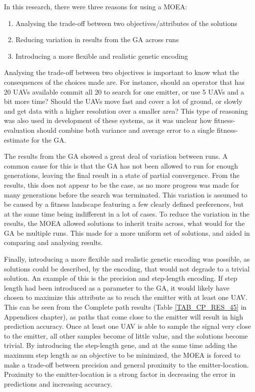 \documentclass[10pt,a4paper]{book}
\begin{document}
In this research, there were three reasons for using a \gls{MOEA}:

\begin{enumerate}
\item Analysing the trade-off between two objectives/attributes of the solutions
\item Reducing variation in results from the \gls{GA} across runs
\item Introducing a more flexible and realistic genetic encoding
\end{enumerate}

Analysing the trade-off between two objectives is important to know what the consequences of the choices made are. For instance, should an operator that has 20 \glspl{UAV} available commit all 20 to search for one emitter, or use 5 \glspl{UAV} and a bit more time? Should the \glspl{UAV} move fast and cover a lot of ground, or slowly and get data with a higher resolution over a smaller area? This type of reasoning was also used in development of these systems, as it was unclear how fitness-evaluation should combine both variance and average error to a single fitness-estimate for the \gls{GA}. 


The results from the \gls{GA} showed a great deal of variation between runs. A common cause for this is that the \gls{GA} has not been allowed to run for enough generations, leaving the final result in a state of partial convergence. From the results, this does not appear to be the case, as no more progress was made for many generations before the search was terminated. This variation is assumed to be caused by a fitness landscape featuring a few clearly defined preferences, but at the same time being indifferent in a lot of cases. To reduce the variation in the results, the \gls{MOEA} allowed solutions to inherit traits across, what would for the \gls{GA} be multiple runs. This made for a more uniform set of solutions, and aided in comparing and analysing results.

Finally, introducing a more flexible and realistic genetic encoding was possible, as solutions could be described, by the encoding, that would not degrade to a trivial solution. An example of this is the precision and step-length encoding. If step length had been introduced as a parameter to the \gls{GA}, it would likely have chosen to maximize this attribute as to reach the emitter with at least one \gls{UAV}. This can be seen from the Complete path results (Table \ref{TAB_CP_RES_45} in Appendices chapter), as paths that come close to the emitter will result in high prediction accuracy.  Once at least one \gls{UAV} is able to sample the signal very close to the emitter, all other samples become of little value, and the solutions become trivial. By introducing the step-length gene, and at the same time adding the maximum step length as an objective to be minimized, the \gls{MOEA} is forced to make a trade-off between precision and general proximity to the emitter-location. Proximity to the emitter-location is a strong factor in decreasing the error in predictions and increasing accuracy. 
\end{document}
